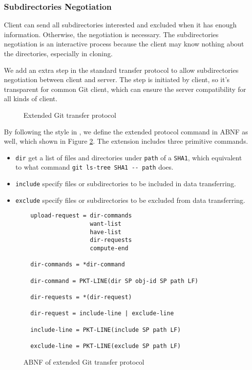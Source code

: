 \documentclass[preprint]{sigplanconf}
\begin{document}
\subsubsection{Subdirectories Negotiation}
Client can send all subdirectories interested and excluded when it has enough information.
Otherwise, the negotiation is necessary.
The subdirectories negotiation is an interactive process because the client may know nothing about the directories, especially in cloning.

We add an extra step in the standard transfer protocol to allow subdirectories
negotiation between client and server.
The step is initiated by client, so it's transparent for common Git client,
which can ensure the server compatibility for all kinds of client.
\begin{figure}[htpb]
  \centering
  
  \caption{Extended Git transfer protocol}
  \label{fig:git-proto-ext-seq}
\end{figure}

By following the style in \cite{tran-protocol}, we define the extended
protocol command in ABNF as well, which shown in Figure
\ref{fig:git-proto-ext-ABNF}.
The extension includes three primitive commands.
\begin{itemize}
  \item \verb|dir| get a list of files and directories under \verb|path| of a
    \verb|SHA1|, which equivalent to what command
    \verb|git ls-tree SHA1 -- path| does.
  \item \verb|include| specify files or subdirectories to be included in data
    transferring.
  \item \verb|exclude| specify files or subdirectories to be excluded from data
    transferring.
\end{itemize}

\begin{figure}[htpb]
  \centering
  \begin{verbatim}
  upload-request = dir-commands
                   want-list
                   have-list
                   dir-requests
                   compute-end

  dir-commands = *dir-command

  dir-command = PKT-LINE(dir SP obj-id SP path LF)

  dir-requests = *(dir-request)

  dir-request = include-line | exclude-line

  include-line = PKT-LINE(include SP path LF)

  exclude-line = PKT-LINE(exclude SP path LF)
  \end{verbatim}
  \caption{ABNF of extended Git transfer protocol}
  \label{fig:git-proto-ext-ABNF}
\end{figure}
\end{document}
